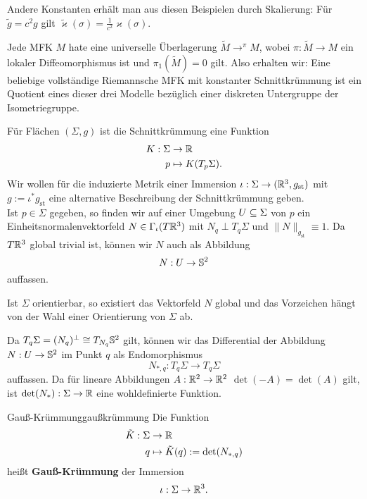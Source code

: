 \begin{bemerkung}
Andere Konstanten erhält man aus diesen Beispielen durch Skalierung: Für $\tilde{g} = c^2 g$ gilt $\tilde{\varkappa}(\sigma)=\frac{1}{c^2}\varkappa(\sigma)$.
\end{bemerkung}
\begin{bemerkung}
Jede MFK $M$ hate eine universelle Überlagerung $\tilde{M} \to^\pi M$, wobei $\pi: \tilde{M} \to M$ ein lokaler Diffeomorphismus ist und $\pi_1(\tilde{M})=0$ gilt. Also erhalten wir: Eine beliebige vollständige Riemannsche MFK mit konstanter Schnittkrümmung ist ein Quotient eines dieser drei Modelle bezüglich einer diskreten Untergruppe der Isometriegruppe.
\end{bemerkung}
Für Flächen $(\Sigma, g)$ ist die Schnittkrümmung eine Funktion
\begin{align}
K: \Sigma &\to \mathbb{R}\\
p &\mapsto K(T_p\Sigma).
\end{align}
Wir wollen für die induzierte Metrik einer Immersion $\iota: \Sigma \to (\mathbb{R}^3, g_\text{st})$ mit $g:= \iota^\ast g_\text{st}$ eine alternative Beschreibung der Schnittkrümmung geben.\\
Ist $p \in \Sigma$ gegeben, so finden wir auf einer Umgebung $U \subseteq \Sigma$ von $p$ ein Einheitsnormalenvektorfeld $N \in \Gamma_\iota (T\mathbb{R}^3)$ mit $N_q \perp T_q\Sigma$ und $\| N \|_{g_\text{st}} \equiv 1$. Da $T\mathbb{R}^3$ global trivial ist, können wir $N$ auch als Abbildung 
\begin{equation}
N: U \to \mathbb{S}^2
\end{equation}
auffassen.
\begin{bemerkung}
Ist $\Sigma$ orientierbar, so existiert das Vektorfeld $N$ global und das Vorzeichen hängt von der Wahl einer Orientierung von $\Sigma$ ab.
\end{bemerkung}
Da $T_q\Sigma = (N_q)^{\perp} \cong T_{N_q}\mathbb{S}^2$ gilt, können wir das Differential der Abbildung $N: U \to \mathbb{S}^2$ im Punkt $q$ als Endomorphismus
\begin{equation}
N_{\ast,q}: T_q\Sigma \to T_q \Sigma
\end{equation}
auffassen. Da für lineare Abbildungen $A: \mathbb{R}^2 \to \mathbb{R}^2$ $\det(-A) = \det(A)$ gilt, ist $\det(N_\ast): \Sigma \to \mathbb{R}$ eine wohldefinierte Funktion.
\begin{definition}{Gauß-Krümmung}{gaußkrümmung}
Die Funktion
\begin{align}
\tilde{K}: \Sigma &\to \mathbb{R} \\
q &\mapsto \tilde{K}(q):=\det(N_{\ast, q})
\end{align}
heißt \textbf{Gauß-Krümmung} der Immersion
\begin{equation}
\iota: \Sigma \to \mathbb{R}^3.
\end{equation}
\end{definition}
